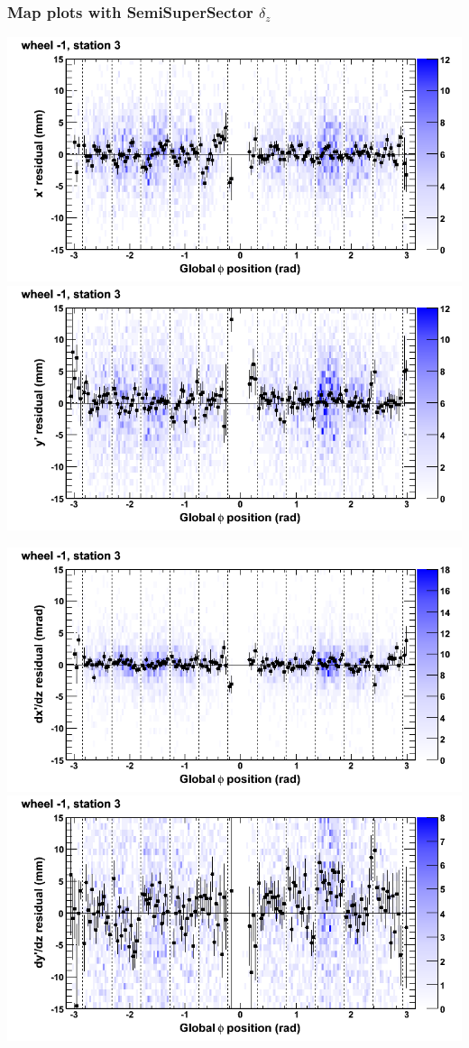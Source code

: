 \documentclass[compress]{beamer}
\begin{document}
\begin{frame}
\frametitle{Map plots with SemiSuperSector $\delta_z$}
\includegraphics[width=0.5\linewidth]{zfit_mapplots/DTvsphi_st3whB_x.png}
\includegraphics[width=0.5\linewidth]{zfit_mapplots/DTvsphi_st3whB_y.png}

\includegraphics[width=0.5\linewidth]{zfit_mapplots/DTvsphi_st3whB_dxdz.png}
\includegraphics[width=0.5\linewidth]{zfit_mapplots/DTvsphi_st3whB_dydz.png}
\end{frame}
\end{document}
